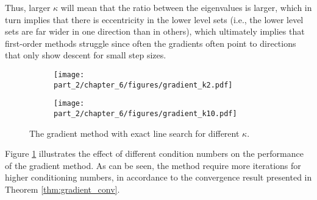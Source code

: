 Thus, larger $\kappa$ will mean that the ratio between the eigenvalues is larger, which in turn implies that there is eccentricity in the lower level sets (i.e., the lower level sets are far wider in one direction than in others), which ultimately implies that first-order methods struggle since often the gradients often point to directions that only show descent for small step sizes.

\begin{figure}[h]
\begin{subfigure}[b]{\textwidth}
    \centering
   \texttt{[image: part\_2/chapter\_6/figures/gradient\_k2.pdf]}
\end{subfigure}
\hfill
\begin{subfigure}[b]{\textwidth}
    \centering
   \texttt{[image: part\_2/chapter\_6/figures/gradient\_k10.pdf]}
\end{subfigure}
\caption{The gradient method with exact line search for different $\kappa$.}\label{fig:figure_5}
\end{figure}



Figure \ref{fig:figure_5} illustrates the effect of different condition numbers on the performance of the gradient method. As can be seen, the method require more iterations for higher conditioning numbers, in accordance to the convergence result presented in Theorem \ref{thm:gradient_conv}.

